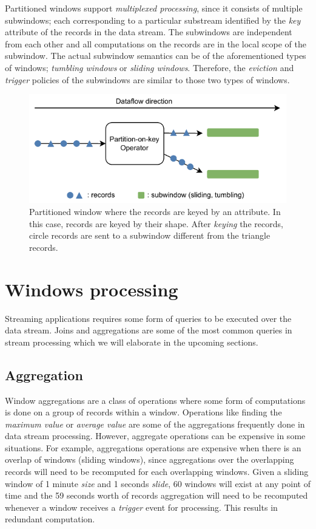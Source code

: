 Partitioned windows support \emph{multiplexed processing}, since it consists of  
multiple subwindows; each corresponding to a particular substream identified 
by the \emph{key} attribute of the records in the data stream. The subwindows 
are independent from each other and all computations on the records are in the local scope 
of the subwindow. The actual subwindow semantics can be of the aforementioned types 
of windows; \emph{tumbling windows} or \emph{sliding windows}. Therefore, the 
\emph{eviction} and \emph{trigger} policies of the subwindows 
are similar to those two types of windows. 


\begin{figure}[htpb]
    \centering
    \includegraphics[width=0.8\linewidth]{fig/partitioned_window.pdf}
    \caption{Partitioned window where the records are keyed by an attribute. In this case,
    records are keyed by their shape. After \emph{keying} the records, circle records are sent 
    to a subwindow different from the triangle records.}%
    \label{fig:partitioned_window}
\end{figure}
   

\section{Windows processing}
\label{sec:windows_processing}

Streaming applications requires some form of queries to be executed over 
the data stream. Joins and aggregations are some of the most common queries 
in stream processing which we will elaborate in the upcoming sections. 

\subsection{Aggregation}%
\label{sub:Aggregation}
Window aggregations are a class of operations where some form of computations 
is done on a group of records within a window. Operations like 
finding the \emph{maximum value} or \emph{average value} are some of the 
aggregations frequently done in data stream processing. However, 
aggregate operations can be expensive in some situations. 
For example, aggregations operations are expensive when there is 
an overlap of windows (sliding windows), since aggregations over the overlapping 
records will need to be recomputed for each overlapping windows. Given a sliding 
window of 1 minute \emph{size} and 1 seconds \emph{slide}, 60 windows will exist 
at any point of time and the 59 seconds worth of records aggregation will need 
to be recomputed whenever a window receives a \emph{trigger} event for processing. 
This results in redundant computation. 

